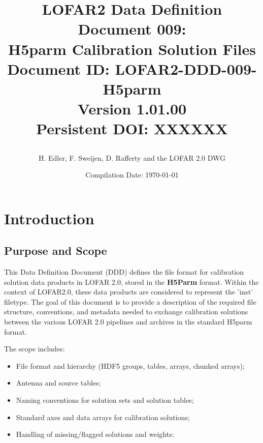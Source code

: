 \documentclass[a4paper,10pt,bibtotoc]{scrartcl}
\begin{document}

\title{LOFAR2 Data Definition Document 009: \\ H5parm Calibration Solution Files \\
{\normalsize Document ID: LOFAR2-DDD-009-H5parm} \\
{\normalsize Version 1.01.00} \\
{\normalsize Persistent DOI: XXXXXX} \\
\author{H. Edler, F. Sweijen, D. Rafferty and the LOFAR 2.0 DWG}
\date{\small{Compilation Date: \today}}}
\maketitle
\tableofcontents

\listoffigures

\listoftables

\clearpage


\section{Introduction}
\label{sec:introduction}

\subsection{Purpose and Scope}
This Data Definition Document (DDD) defines the file format for {calibration solution} data products in LOFAR 2.0, stored in the \textbf{H5Parm} format. Within the context of LOFAR2.0, these data products are considered to represent the 'inst' filetype. The goal of this document is to provide a  description of the required file structure, conventions, and metadata needed to exchange calibration solutions between the various LOFAR 2.0 pipelines and archives in the standard H5parm format.

The scope includes:
\begin{itemize}
  \item File format and hierarchy (HDF5 groups, tables, arrays, chunked arrays);
  \item Antenna and source tables;
  \item Naming conventions for solution sets and solution tables;
  \item Standard axes and data arrays for calibration solutions;
  \item Handling of missing/flagged solutions and weights;
\end{itemize}
\end{document}

